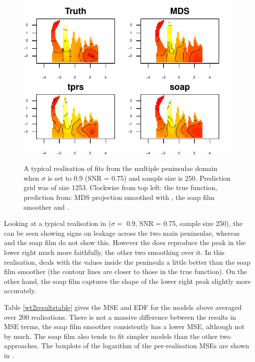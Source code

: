\begin{figure}
\centering
\includegraphics[width=6in]{mds/figs/wt2-comp-09.pdf} \\
\caption{A typical realisation of fits from the multiple peninsulae domain when $\sigma$ is set to 0.9 (SNR = 0.75) and sample size is 250. Prediction grid was of size 1253. Clockwise from top left: the true function, prediction from: MDS projection smoothed with \tprs, the soap film smoother and \tprs.}
\label{wt2-comp-0.9}
\end{figure}

Looking at a typical realisation in  ($\sigma=$ 0.9, SNR = 0.75, sample size 250), the \tprs can be seen showing signs on leakage across the two main peninsulae, whereas \mdsap and the soap film do not show this. However the \tprs does reproduce the peak in the lower right much more faithfully, the other two smoothing over it. In this realisation, \mdsap deals with the values inside the peninsula a little better than the soap film smoother (the contour lines are closer to those in the true function). On the other hand, the soap film captures the shape of the lower right peak slightly more accurately.

Table \ref{wt2resultstable} gives the MSE and EDF for the models above averaged over 200 realisations. There is not a massive difference between the results in MSE terms, the soap film smoother consistently has a lower MSE, although not by much. The soap film also tends to fit simpler models than the other two approaches. The boxplots of the logarithm of the per-realisation MSEs are shown in .

